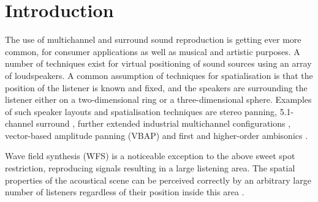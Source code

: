 \documentclass[twoside,10pt]{article}
\title{\papertitle}
\begin{document}
    
\maketitle




%
%




\begin{abstract}
The abstract should be placed at the top left column and should contain
about 150 words.
\end{abstract}








%
%


\section{Introduction}\label{sec:introduction}

The use of multichannel and surround sound reproduction is getting ever more common, for consumer applications as well as musical and artistic purposes. A number of techniques exist for virtual positioning of sound sources using an array of loudspeakers. A common assumption of techniques for spatialisation is that the position of the listener is known and fixed, and the speakers are surrounding the listener either on a two-dimensional ring or a three-dimensional sphere. Examples of such speaker layouts and spatialisation techniques are stereo panning, 5.1-channel surround \cite{ITU:1993_surround_5:1}, further extended industrial multichannel configurations \cite{Rumsey:2001spatial_audio}, vector-based amplitude panning (VBAP) \cite{Pulkki:1997vbap} and first and higher-order ambisonics \cite{Gerzon:1974surround, Poletti:2000holographic_sound}.

Wave field synthesis (WFS) is a noticeable exception to the above sweet spot restriction, reproducing signals resulting in a large listening area. The spatial properties of the acoustical scene can be perceived correctly by an arbitrary large number of listeners regardless of their position inside this area \cite{Spors:2004sound_field_synthesis}.
\end{document}
